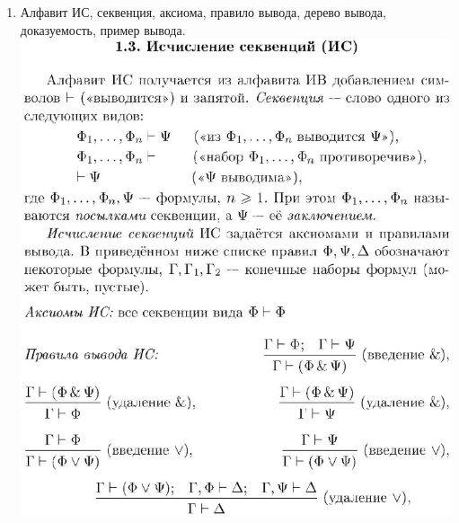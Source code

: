 \documentclass[a4paper]{article}
\theoremstyle{definition}
\begin{document}
\begin{enumerate}
       \begin{proof}
        Оба принципа индукции легко вытекают из следующего факта: в любом непустом множестве натуральных числе есть минимальный элемент. Покажем, как отсюда выводится возвратная индукция. \\
        Допустим, что $\Delta(n)$ ложно при некотором $n$. Рассмотрим множество $A = \{n | \Delta(n) \text{ ложно} \}$. Оно не пусто, следовательно, в нём есть минимальный элемент $n_0$. Тогда $\Delta(n_0)$ ложно, а если $n < n_0$, то $n \notin A$ и $\Delta(n)$ истинно. Получаем, что $\Delta(n_0)$ тоже истинно, противоречие.
       \end{proof}
 \item Алфавит ИС, секвенция, аксиома, правило вывода, дерево вывода, доказуемость, пример вывода.
       \mbox{}\\ \includegraphics[scale=0.7]{31_1.jpg}\\

\end{enumerate}
\end{document}
